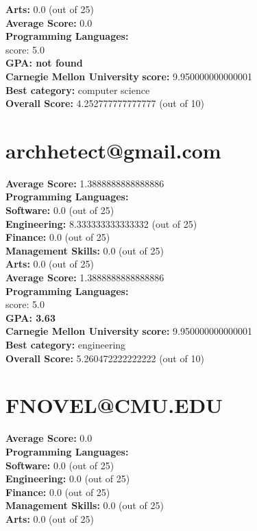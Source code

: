 \documentclass{article}
\begin{document}
    \textbf{Arts:} 0.0 (out of 25)\\
\textbf{Average Score: } 0.0\\
\textbf{Programming Languages:} \\
score: 5.0\\
\textbf{GPA: not found}\\
\textbf{Carnegie Mellon University} \textbf{score:} 9.950000000000001\\
\textbf{Best category: } computer science\\
    \textbf{Overall Score: }4.252777777777777 (out of 10)\section{archhetect@gmail.com}
\textbf{Average Score: } 1.3888888888888886\\
\textbf{Programming Languages:} \\
\textbf{Software:} 0.0 (out of 25)\\
    \textbf{Engineering: } 8.333333333333332 (out of 25)\\
    \textbf{Finance:} 0.0 (out of 25)\\
    \textbf{Management Skills:} 0.0 (out of 25)\\
    \textbf{Arts:} 0.0 (out of 25)\\
\textbf{Average Score: } 1.3888888888888886\\
\textbf{Programming Languages:} \\
score: 5.0\\
\textbf{GPA: 3.63}\\
\textbf{Carnegie Mellon University} \textbf{score:} 9.950000000000001\\
\textbf{Best category: } engineering\\
    \textbf{Overall Score: }5.260472222222222 (out of 10)\section{FNOVEL@CMU.EDU}
\textbf{Average Score: } 0.0\\
\textbf{Programming Languages:} \\
\textbf{Software:} 0.0 (out of 25)\\
    \textbf{Engineering: } 0.0 (out of 25)\\
    \textbf{Finance:} 0.0 (out of 25)\\
    \textbf{Management Skills:} 0.0 (out of 25)\\
    \textbf{Arts:} 0.0 (out of 25)\\
\end{document}
